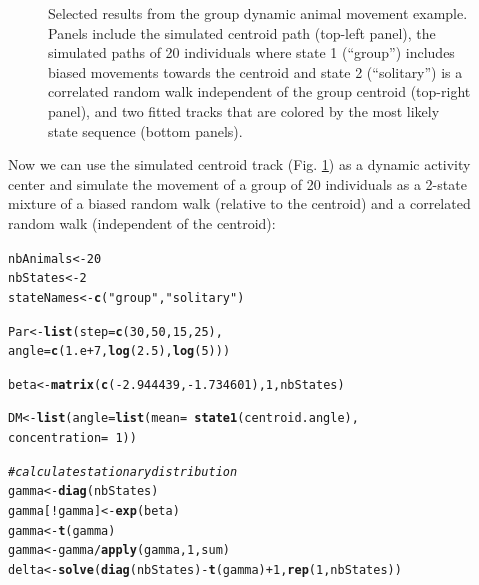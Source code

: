 \documentclass[12pt]{article}\usepackage[]{graphicx}\usepackage[]{color}
\makeatletter
\newcommand{\hlnum}[1]{\textcolor[rgb]{0.686,0.059,0.569}{#1}}%
\newcommand{\hlstr}[1]{\textcolor[rgb]{0.192,0.494,0.8}{#1}}%
\newcommand{\hlcom}[1]{\textcolor[rgb]{0.678,0.584,0.686}{\textit{#1}}}%
\newcommand{\hlopt}[1]{\textcolor[rgb]{0,0,0}{#1}}%
\newcommand{\hlstd}[1]{\textcolor[rgb]{0.345,0.345,0.345}{#1}}%
\newcommand{\hlkwb}[1]{\textcolor[rgb]{0.69,0.353,0.396}{#1}}%
\newcommand{\hlkwc}[1]{\textcolor[rgb]{0.333,0.667,0.333}{#1}}%
\newcommand{\hlkwd}[1]{\textcolor[rgb]{0.737,0.353,0.396}{\textbf{#1}}}%
\newenvironment{kframe}{%
 \def\at@end@of@kframe{}%
 \ifinner\ifhmode%
  \def\at@end@of@kframe{\end{minipage}}%
  \begin{minipage}{\columnwidth}%
 \fi\fi%
 \def\FrameCommand##1{\hskip\@totalleftmargin \hskip-\fboxsep
 \colorbox{shadecolor}{##1}\hskip-\fboxsep
     \hskip-\linewidth \hskip-\@totalleftmargin \hskip\columnwidth}%
 \MakeFramed {\advance\hsize-\width
   \@totalleftmargin\z@ \linewidth\hsize
   \@setminipage}}%
 {\par\unskip\endMakeFramed%
 \at@end@of@kframe}
\newenvironment{knitrout}{}{} %
\makeatother
\begin{document}
\begin{figure}[htbp]
  \caption{Selected results from the group dynamic animal movement example. Panels include the simulated centroid path (top-left panel), the simulated paths of 20 individuals where state 1 (``group'') includes biased movements towards the centroid and state 2 (``solitary'') is a correlated random walk independent of the group centroid (top-right panel), and two fitted tracks that are colored by the most likely state sequence (bottom panels).}
  \label{fig:groupResults}
\end{figure}
Now we can use the simulated centroid track (Fig. \ref{fig:groupResults}) as a dynamic activity center and simulate the movement of a group of 20 individuals as a 2-state mixture of a biased random walk (relative to the centroid) and a correlated random walk (independent of the centroid):
\begin{knitrout}
\color{fgcolor}\begin{kframe}
\begin{alltt}
\hlstd{nbAnimals} \hlkwb{<-} \hlnum{20}
\hlstd{nbStates} \hlkwb{<-} \hlnum{2}
\hlstd{stateNames} \hlkwb{<-} \hlkwd{c}\hlstd{(}\hlstr{"group"}\hlstd{,}\hlstr{"solitary"}\hlstd{)}

\hlstd{Par} \hlkwb{<-} \hlkwd{list}\hlstd{(}\hlkwc{step} \hlstd{=} \hlkwd{c}\hlstd{(}\hlnum{30}\hlstd{,}\hlnum{50}\hlstd{,}\hlnum{15}\hlstd{,}\hlnum{25}\hlstd{),}
            \hlkwc{angle} \hlstd{=} \hlkwd{c}\hlstd{(}\hlnum{1.e+7}\hlstd{,}\hlkwd{log}\hlstd{(}\hlnum{2.5}\hlstd{),}\hlkwd{log}\hlstd{(}\hlnum{5}\hlstd{)))}

\hlstd{beta} \hlkwb{<-} \hlkwd{matrix}\hlstd{(}\hlkwd{c}\hlstd{(}\hlopt{-}\hlnum{2.944439}\hlstd{,}\hlopt{-}\hlnum{1.734601}\hlstd{),}\hlnum{1}\hlstd{,nbStates)}

\hlstd{DM} \hlkwb{<-} \hlkwd{list}\hlstd{(}\hlkwc{angle}\hlstd{=}\hlkwd{list}\hlstd{(}\hlkwc{mean} \hlstd{=} \hlopt{~}\hlkwd{state1}\hlstd{(centroid.angle),}
                      \hlkwc{concentration} \hlstd{=} \hlopt{~}\hlnum{1}\hlstd{))}

\hlcom{# calculate stationary distribution}
\hlstd{gamma} \hlkwb{<-} \hlkwd{diag}\hlstd{(nbStates)}
\hlstd{gamma[}\hlopt{!}\hlstd{gamma]} \hlkwb{<-} \hlkwd{exp}\hlstd{(beta)}
\hlstd{gamma} \hlkwb{<-} \hlkwd{t}\hlstd{(gamma)}
\hlstd{gamma} \hlkwb{<-} \hlstd{gamma}\hlopt{/}\hlkwd{apply}\hlstd{(gamma,}\hlnum{1}\hlstd{,sum)}
\hlstd{delta} \hlkwb{<-} \hlkwd{solve}\hlstd{(}\hlkwd{diag}\hlstd{(nbStates)} \hlopt{-} \hlkwd{t}\hlstd{(gamma)} \hlopt{+} \hlnum{1}\hlstd{,} \hlkwd{rep}\hlstd{(}\hlnum{1}\hlstd{, nbStates))}


\end{alltt}
\end{kframe}
\end{knitrout}
\end{document}
